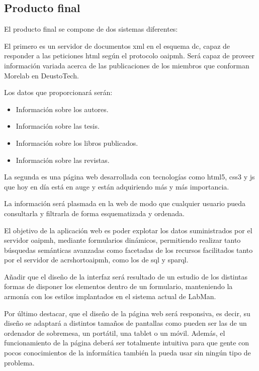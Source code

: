 \subsection{Producto final}

El producto final se compone de dos sistemas diferentes:

El primero es un servidor de documentos \acrshort{xml}\cite{XML} en el esquema \acrshort{dc}, capaz de responder a las peticiones \acrshort{html} según el protocolo \acrshort{oaipmh}. Será capaz de proveer información variada acerca de las publicaciones de los miembros que conforman Morelab en DeustoTech.

Los datos que proporcionará serán:

\begin{itemize}
	\item Información sobre los autores.
	\item Información sobre las tesis.
	\item Información sobre los libros publicados.
	\item Información sobre las revistas.
\end{itemize}

La segunda es una página web desarrollada con tecnologías como \acrshort{html}5, \acrshort{css}3 y \acrshort{js} que hoy en día está en auge y están adquiriendo más y más importancia.

La información será plasmada en la web de modo que cualquier usuario pueda consultarla y filtrarla de forma esquematizada y ordenada.

El objetivo de la aplicación web es poder explotar los datos suministrados por el servidor \acrshort{oaipmh}, mediante formularios dinámicos, permitiendo realizar tanto búsquedas semánticas avanzadas como facetadas de los recursos facilitados tanto por el servidor de acrshort{oaipmh}, como los de \acrshort{sql} y \acrshort{sparql}.

Añadir que el diseño de la interfaz será resultado de un estudio de los distintas formas de disponer los elementos dentro de un formulario, manteniendo la armonía con los estilos implantados en el sistema actual de LabMan.

Por último destacar, que el diseño de la página web será responsiva, es decir, su diseño se adaptará a distintos tamaños de pantallas como pueden ser las de un ordenador de sobremesa, un portátil, una tablet o un móvil. Además, el funcionamiento de la página deberá ser totalmente intuitiva para que gente con pocos conocimientos de la informática también la pueda usar sin ningún tipo de problema.